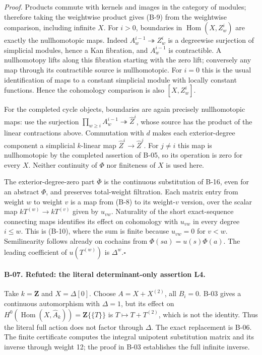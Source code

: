 \emph{Proof.}
Products commute with kernels and images in the category of modules;
therefore taking the weightwise product gives (B-9) from the
weightwise comparison, including infinite $X$. For $i>0$, boundaries
in $\operatorname{Hom}(X,Z_w^i)$ are exactly the nullhomotopic maps.
Indeed $A_w^{i-1}\twoheadrightarrow Z_w^i$ is a degreewise
surjection of simplicial modules, hence a Kan fibration, and
$A_w^{i-1}$ is contractible. A nullhomotopy lifts along this fibration
starting with the zero lift; conversely any map through its
contractible source is nullhomotopic. For $i=0$ this is the usual
identification of maps to a constant simplicial module with
locally constant functions. Hence the cohomology comparison is also
$[X,Z_w^i]$.

For the completed cycle objects, boundaries are again precisely
nullhomotopic maps: use the surjection
$\prod_{w\geq i}A_w^{i-1}\twoheadrightarrow\widehat Z^i$,
whose source has the product of the linear contractions above.
Commutation with $d$ makes each exterior-degree component a
simplicial $k$-linear map
$\widehat Z^i\to\widehat Z^j$. For $j\ne i$ this map is
nullhomotopic by the completed assertion of B-05, so its operation
is zero for every $X$. Neither continuity of $\Phi$ nor finiteness
of $X$ is used here.

The exterior-degree-zero part $\overline\Phi$ is the continuous
substitution of B-16, even for an abstract $\Phi$, and preserves
total-weight filtration. Each matrix entry from weight $w$ to weight $v$
is a map from (B-8) to its weight-$v$ version, over the scalar map
$kT^{(w)}\to kT^{(v)}$ given by $u_{vw}$. Naturality of the short
exact-sequence connecting maps identifies its effect on cohomology
with $u_{vw}$ in every degree $i\leq w$. This is (B-10), where the
sum is finite because $u_{vw}=0$ for $v<w$.
Semilinearity follows already on cochains from
$\Phi(sa)=u(s)\Phi(a)$. The leading coefficient of
$u(T^{(w)})$ is $\Delta^w$.\hfill$\square$

\paragraph{B-07. Refuted: the literal determinant-only assertion L4.}
Take $k=\mathbf Z$ and $X=\Delta[0]$. Choose
$A=X+X^{(2)}$, all $B_i=0$. B-03 gives a continuous automorphism
with $\Delta=1$, but its effect on
$H^0(\operatorname{Hom}(X,\widehat A_k))=\mathbf Z\{\{T\}\}$
is $T\mapsto T+T^{(2)}$, which is not the identity.
Thus the literal full action does not factor through $\Delta$.
The exact replacement is B-06. The finite certificate computes the
integral unipotent substitution matrix and its inverse through
weight 12; the proof in B-03 establishes the full infinite inverse.

